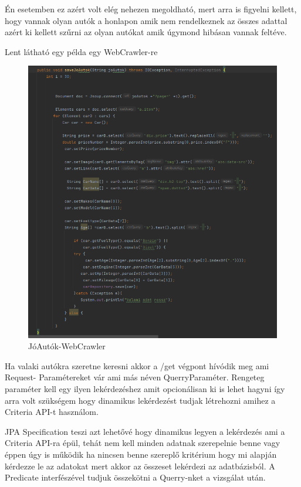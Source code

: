 Én esetemben ez azért volt elég nehezen megoldható, mert arra is figyelni kellett, hogy vannak olyan autók a honlapon amik nem rendelkeznek az összes adattal azért ki kellett szűrni az olyan autókat amik úgymond hibásan vannak feltéve. 

Lent látható egy példa egy WebCrawler-re

\begin{figure}[h]
\centering
\includegraphics[scale=0.7]{images/JoAutok_WebCrawler.png}
\caption{JóAutók-WebCrawler}
\label{fig:JóAutók-WebCrawler}
\end{figure}


Ha valaki autókra szeretne keresni akkor a /get végpont hívódik meg ami Request-
Paramétereket vár ami más néven QuerryParaméter. Rengeteg paraméter kell egy ilyen lekérdezéshez amit opcionálisan ki is lehet hagyni így arra volt szükségem hogy dinamikus lekérdezést tudjak létrehozni amihez a Criteria API-t használom.

JPA Specification teszi azt lehetővé hogy dinamikus legyen a lekérdezés ami a Criteria API-ra épül, tehát nem kell minden adatnak szerepelnie benne vagy éppen úgy is működik ha nincsen benne szereplő kritérium hogy mi alapján kérdezze le az adatokat mert akkor az összeset lekérdezi az adatbázisból. A Predicate interfészével tudjuk összekötni a Querry-nket a vizsgálat után.

